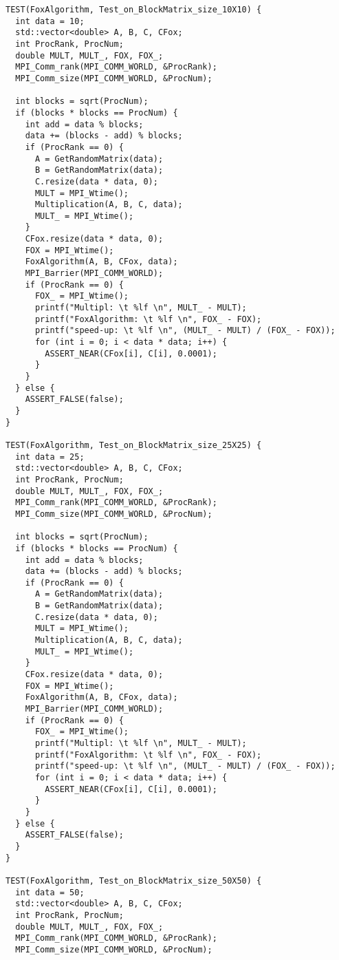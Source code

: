 \documentclass{report}
\begin{document}
\begin{lstlisting}
TEST(FoxAlgorithm, Test_on_BlockMatrix_size_10X10) {
  int data = 10;
  std::vector<double> A, B, C, CFox;
  int ProcRank, ProcNum;
  double MULT, MULT_, FOX, FOX_;
  MPI_Comm_rank(MPI_COMM_WORLD, &ProcRank);
  MPI_Comm_size(MPI_COMM_WORLD, &ProcNum);

  int blocks = sqrt(ProcNum);
  if (blocks * blocks == ProcNum) {
    int add = data % blocks;
    data += (blocks - add) % blocks;
    if (ProcRank == 0) {
      A = GetRandomMatrix(data);
      B = GetRandomMatrix(data);
      C.resize(data * data, 0);
      MULT = MPI_Wtime();
      Multiplication(A, B, C, data);
      MULT_ = MPI_Wtime();
    }
    CFox.resize(data * data, 0);
    FOX = MPI_Wtime();
    FoxAlgorithm(A, B, CFox, data);
    MPI_Barrier(MPI_COMM_WORLD);
    if (ProcRank == 0) {
      FOX_ = MPI_Wtime();
      printf("Multipl: \t %lf \n", MULT_ - MULT);
      printf("FoxAlgorithm: \t %lf \n", FOX_ - FOX);
      printf("speed-up: \t %lf \n", (MULT_ - MULT) / (FOX_ - FOX));
      for (int i = 0; i < data * data; i++) {
        ASSERT_NEAR(CFox[i], C[i], 0.0001);
      }
    }
  } else {
    ASSERT_FALSE(false);
  }
}

TEST(FoxAlgorithm, Test_on_BlockMatrix_size_25X25) {
  int data = 25;
  std::vector<double> A, B, C, CFox;
  int ProcRank, ProcNum;
  double MULT, MULT_, FOX, FOX_;
  MPI_Comm_rank(MPI_COMM_WORLD, &ProcRank);
  MPI_Comm_size(MPI_COMM_WORLD, &ProcNum);

  int blocks = sqrt(ProcNum);
  if (blocks * blocks == ProcNum) {
    int add = data % blocks;
    data += (blocks - add) % blocks;
    if (ProcRank == 0) {
      A = GetRandomMatrix(data);
      B = GetRandomMatrix(data);
      C.resize(data * data, 0);
      MULT = MPI_Wtime();
      Multiplication(A, B, C, data);
      MULT_ = MPI_Wtime();
    }
    CFox.resize(data * data, 0);
    FOX = MPI_Wtime();
    FoxAlgorithm(A, B, CFox, data);
    MPI_Barrier(MPI_COMM_WORLD);
    if (ProcRank == 0) {
      FOX_ = MPI_Wtime();
      printf("Multipl: \t %lf \n", MULT_ - MULT);
      printf("FoxAlgorithm: \t %lf \n", FOX_ - FOX);
      printf("speed-up: \t %lf \n", (MULT_ - MULT) / (FOX_ - FOX));
      for (int i = 0; i < data * data; i++) {
        ASSERT_NEAR(CFox[i], C[i], 0.0001);
      }
    }
  } else {
    ASSERT_FALSE(false);
  }
}

TEST(FoxAlgorithm, Test_on_BlockMatrix_size_50X50) {
  int data = 50;
  std::vector<double> A, B, C, CFox;
  int ProcRank, ProcNum;
  double MULT, MULT_, FOX, FOX_;
  MPI_Comm_rank(MPI_COMM_WORLD, &ProcRank);
  MPI_Comm_size(MPI_COMM_WORLD, &ProcNum);


\end{lstlisting}
\end{document}
